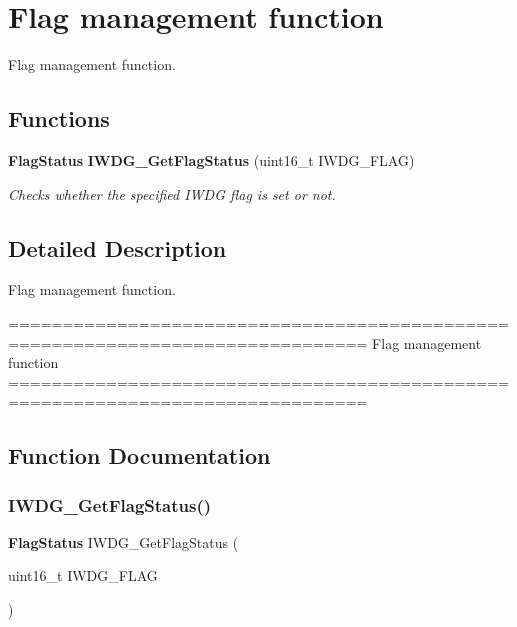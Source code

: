 \section{Flag management function}
\label{group__IWDG__Group3}


Flag management function.  


\subsection*{Functions}
\begin{DoxyCompactItemize}
\item 
\textbf{ Flag\+Status} \textbf{ I\+W\+D\+G\+\_\+\+Get\+Flag\+Status} (uint16\+\_\+t I\+W\+D\+G\+\_\+\+F\+L\+AG)
\begin{DoxyCompactList}\small\item\em Checks whether the specified I\+W\+DG flag is set or not. \end{DoxyCompactList}\end{DoxyCompactItemize}


\subsection{Detailed Description}
Flag management function. 

\begin{DoxyVerb} ===============================================================================
                            Flag management function 
 ===============================================================================  \end{DoxyVerb}
 

\subsection{Function Documentation}
\mbox{\label{group__IWDG__Group3_ga37f050cfbedc0c15f9e0816c0b22011e}} 
\subsubsection{I\+W\+D\+G\+\_\+\+Get\+Flag\+Status()}
{\footnotesize\ttfamily \textbf{ Flag\+Status} I\+W\+D\+G\+\_\+\+Get\+Flag\+Status (\begin{DoxyParamCaption}\item[{uint16\+\_\+t}]{I\+W\+D\+G\+\_\+\+F\+L\+AG }\end{DoxyParamCaption})}




